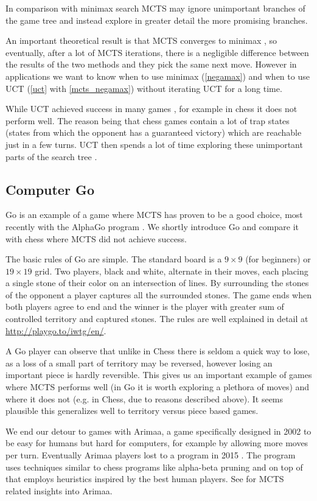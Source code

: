 In comparison with minimax search MCTS may ignore unimportant
branches of the game tree and instead explore in greater detail the more
promising branches.

An important theoretical result is
that MCTS converges to minimax \parencite{Kocsis},
so eventually, after a lot of MCTS iterations, there is a negligible
difference between the results of the two methods and they pick the same
next move. However in
applications we want to know when to use minimax (\autoref{negamax}) and
when to use UCT (\autoref{uct} with \autoref{mcts_negamax}) without
iterating UCT for a long time.

While UCT achieved success in many games \parencite{mcts_survey},
for example in chess it does not perform well. The reason being that chess
games contain a lot of trap states (states from which the opponent
has a guaranteed victory) which are reachable just in a few turns. UCT
then spends a lot of time exploring these unimportant parts of the search
tree \parencite{mcts_vs_chess}.

\subsection{Computer Go}

Go is an example of a game where MCTS has proven to be a good choice,
most recently with the AlphaGo program \parencite{alphago}.
We shortly introduce Go and compare it with chess where MCTS did not
achieve success.

The basic rules of Go are simple. The
standard board is a $9\times9$ (for beginners) or $19 \times 19$ grid.
Two players, black and white, alternate in their moves, each
placing a single stone of their color on an intersection of lines.
By surrounding the stones of the opponent a player captures all the
surrounded stones. The game ends when both players agree to end and the
winner is the player with greater sum of controlled territory and
captured stones.
The rules are well explained in detail at
\href{http://playgo.to/iwtg/en/}{http://playgo.to/iwtg/en/}.

A Go player can observe that unlike in Chess there is seldom a quick way
to lose, as a loss of a small part of territory may be reversed, however
losing an important piece is hardly reversible.
This gives us an important example of games where MCTS performs well (in
Go it is worth exploring a plethora of moves) and where it does not
(e.g. in Chess, due to reasons described above).
It seems plausible this
generalizes well to territory versus piece based games.

We end our detour to games with Arimaa, a game specifically designed in
2002 to be easy for humans but hard for computers, for example by
allowing more moves per turn. Eventually Arimaa players lost to a
program in 2015 \parencite{arimaa}. The program uses techniques similar
to chess programs like alpha-beta pruning and on top of that employs
heuristics inspired by the best human players. See \parencite{jakl} for
MCTS related insights into Arimaa.
